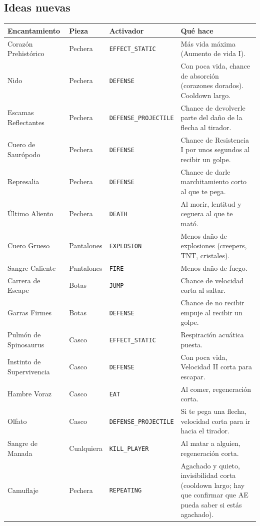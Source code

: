 \documentclass[11pt,a4paper]{article}
\newcommand{\tr}[1]{\texttt{\small #1}}           %
\begin{document}
\subsection{Ideas nuevas}

\begin{longtable}{L{3.3cm} L{1.8cm} L{3.4cm} L{6.8cm}}
\toprule
\textbf{Encantamiento} & \textbf{Pieza} & \textbf{Activador} & \textbf{Qué hace}\\
\midrule
\endhead
Corazón Prehistórico & Pechera & \tr{EFFECT\_STATIC} & Más vida máxima (Aumento de vida I).\\
Nido & Pechera & \tr{DEFENSE} & Con poca vida, chance de absorción (corazones dorados). Cooldown largo.\\
Escamas Reflectantes & Pechera & \tr{DEFENSE\_PROJECTILE} & Chance de devolverle parte del daño de la flecha al tirador.\\
Cuero de Saurópodo & Pechera & \tr{DEFENSE} & Chance de Resistencia I por unos segundos al recibir un golpe.\\
Represalia & Pechera & \tr{DEFENSE} & Chance de darle marchitamiento corto al que te pega.\\
Último Aliento & Pechera & \tr{DEATH} & Al morir, lentitud y ceguera al que te mató.\\
Cuero Grueso & Pantalones & \tr{EXPLOSION} & Menos daño de explosiones (creepers, TNT, cristales).\\
Sangre Caliente & Pantalones & \tr{FIRE} & Menos daño de fuego.\\
Carrera de Escape & Botas & \tr{JUMP} & Chance de velocidad corta al saltar.\\
Garras Firmes & Botas & \tr{DEFENSE} & Chance de no recibir empuje al recibir un golpe.\\
Pulmón de Spinosaurus & Casco & \tr{EFFECT\_STATIC} & Respiración acuática puesta.\\
Instinto de Supervivencia & Casco & \tr{DEFENSE} & Con poca vida, Velocidad II corta para escapar.\\
Hambre Voraz & Casco & \tr{EAT} & Al comer, regeneración corta.\\
Olfato & Casco & \tr{DEFENSE\_PROJECTILE} & Si te pega una flecha, velocidad corta para ir hacia el tirador.\\
Sangre de Manada & Cualquiera & \tr{KILL\_PLAYER} & Al matar a alguien, regeneración corta.\\
Camuflaje & Pechera & \tr{REPEATING} & Agachado y quieto, invisibilidad corta (cooldown largo; hay que confirmar que AE pueda saber si estás agachado).\\
\bottomrule
\end{longtable}
\end{document}
